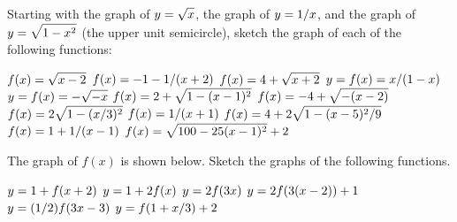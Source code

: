 \begin{exercises}

Starting with the graph of $\displaystyle y=\sqrt{x}$, the graph of $\displaystyle y=1/x$, and the
graph of $\displaystyle y=\sqrt{1-x^2}$ (the upper unit semicircle), sketch the
graph of each of the following functions:

\twocol
\exercise $\displaystyle f(x)=\sqrt{x-2}$
\exercise $\displaystyle f(x)=-1-1/(x+2)$
\exercise $\displaystyle f(x)=4+\sqrt{x+2}$
\exercise $\displaystyle y=f(x)=x/(1-x)$
\exercise $\displaystyle y=f(x)=-\sqrt{-x}$
\exercise $\displaystyle f(x)=2+\sqrt{1-(x-1)^2}$
\exercise $\displaystyle f(x)=-4+\sqrt{-(x-2)}$
\exercise $\displaystyle f(x)=2\sqrt{1-(x/3)^2}$
\exercise $\displaystyle f(x)=1/(x+1)$
\exercise $\displaystyle f(x)=4+2\sqrt{1-(x-5)^2/9}$
\exercise $\displaystyle f(x)=1+1/(x-1)$
\exercise $\displaystyle f(x)=\sqrt{100-25(x-1)^2}+2$
\endtwocol

\msk
\noindent
The graph of $f(x)$ is shown below.
Sketch the graphs of the following functions.


\exercise $\displaystyle y=1+f(x+2)$
\exercise $\displaystyle y=1+2f(x)$
\exercise $\displaystyle y=2f(3x)$
\exercise $\displaystyle y=2f(3(x-2))+1$
\exercise $\displaystyle y=(1/2)f(3x-3)$
\exercise $\displaystyle y=f(1+x/3)+2$

\end{exercises}
